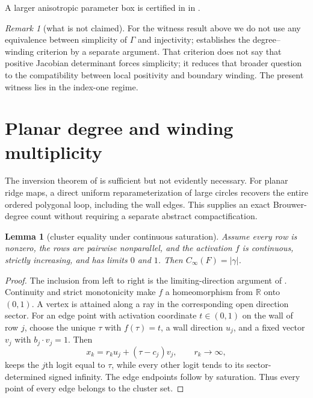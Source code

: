 \documentclass[11pt,twoside,leqno]{article}
\theoremstyle{plain}
\newtheorem{lemma}[lemma]{Lemma}
\theoremstyle{definition}
\theoremstyle{remark}
\newtheorem{remark}[remark]{Remark}
\newcommand{\R}{\mathbb{R}}
\newcommand{\clinf}{C_{\infty}}
\begin{document}
A larger anisotropic parameter box is certified in  in .

\begin{remark}[what is not claimed]\label{rmk:notclaimed}
For the witness result above we do not use any equivalence between simplicity of $\Gamma$ and injectivity;  establishes the degree--winding criterion by a separate argument.  That criterion does not say that positive Jacobian determinant forces simplicity; it reduces that broader question to the compatibility between local positivity and boundary winding. The present witness lies in the index-one regime.
\end{remark}

\section{Planar degree and winding multiplicity}\label{sec:winding}
The inversion theorem of  is sufficient but not evidently necessary.  For planar ridge maps, a direct uniform reparameterization of large circles recovers the entire ordered polygonal loop, including the wall edges. This supplies an exact Brouwer-degree count without requiring a separate abstract compactification.

\begin{lemma}[cluster equality under continuous saturation]\label{lem:equality}
Assume every row is nonzero, the rows are pairwise nonparallel, and the activation $f$ is continuous, strictly increasing, and has limits $0$ and $1$.  Then $\clinf(F)=|\gamma|$.
\end{lemma}
\begin{proof}
The inclusion from left to right is the limiting-direction argument of .  Continuity and strict monotonicity make $f$ a homeomorphism from $\R$ onto $(0,1)$.  A vertex is attained along a ray in the corresponding open direction sector.  For an edge point with activation coordinate $t\in(0,1)$ on the wall of row $j$, choose the unique $\tau$ with $f(\tau)=t$, a wall direction $u_j$, and a fixed vector $v_j$ with $b_j\cdot v_j=1$. Then
\[
 x_k=r_k u_j+(\tau-c_j)v_j,\qquad r_k\longrightarrow\infty,
\]
keeps the $j$th logit equal to $\tau$, while every other logit tends to its sector-determined signed infinity.  The edge endpoints follow by saturation. Thus every point of every edge belongs to the cluster set.
\end{proof}
\end{document}
